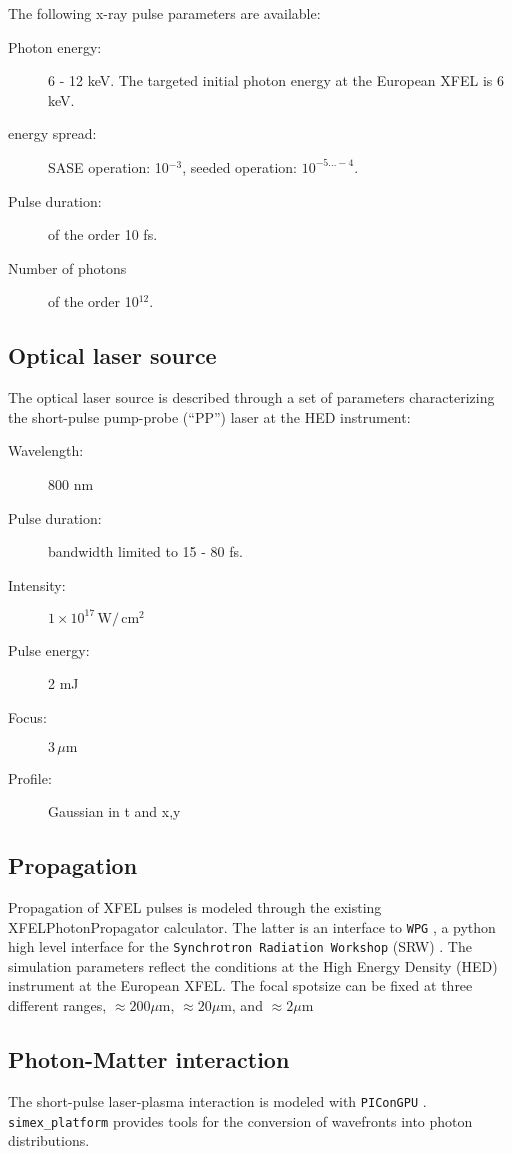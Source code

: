 \documentclass[a4paper]{article}
\begin{document}
The following x-ray pulse parameters are available:
\begin{description}
  \item[Photon energy:] 6 - 12 keV. The targeted initial photon energy at the European XFEL is 6 keV.
  \item[energy spread:] SASE operation: 10$^{-3}$, seeded operation: $10^{-5\dots-4}$.
  \item[Pulse duration:] of the order 10 fs.
  \item[Number of photons] of the order 10$^{12}$.
\end{description}
%
\subsection{Optical laser source}
The optical laser source is described through a set of parameters characterizing the short-pulse pump-probe (``PP'') laser at the HED
instrument:
\begin{description}
  \item[Wavelength:] 800 nm
  \item[Pulse duration:] bandwidth limited to 15 - 80 fs.
  \item[Intensity:] $1\times 10^{17}\,\text{W}/\,\text{cm}^2$
  \item[Pulse energy:] 2 mJ
  \item[Focus:] $3\,\mu\text{m}$
  \item[Profile:] Gaussian in t and x,y
\end{description}
%
\subsection{Propagation\label{sec:short_pulse_prop}}
Propagation of XFEL pulses is modeled through the existing XFELPhotonPropagator calculator. The latter is an interface
to \texttt{WPG} \cite{Samoylova2016_submitted, wpg_github}, a python high level interface for the \texttt{Synchrotron Radiation Workshop} (SRW) \cite{Chubar2008, srw_github}.
The simulation parameters reflect the conditions at the High Energy Density (HED) instrument \cite{Nakatsutsumi2014}
at the European XFEL. The focal spotsize can be fixed at three different ranges,
$\approx 200 \mu\text{m}$, $\approx 20 \mu\text{m}$, and $\approx 2 \mu\text{m}$ 
%
\subsection{Photon-Matter interaction}
The short-pulse laser-plasma interaction is modeled with \texttt{PIConGPU} \cite{Bussmann2013, picongpu_github}.
\texttt{simex\_platform} provides tools for the conversion of wavefronts into photon distributions.
\end{document}
